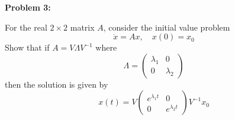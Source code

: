 \documentclass[12pt]{article}
\newenvironment{problem}[1]{
    \textbf{Problem #1:}
}{
    \rmfamily \vspace{1em}
}
\begin{document}
\begin{problem}{3}
    For the real \(2 \times 2\) matrix \(A\), consider the initial value problem
    \[
        \dot{x} = Ax, \quad x(0) = x_0
    \]
    Show that if \(A = V\Lambda V^{-1}\) where
    \[
        \Lambda = \begin{pmatrix}
            \lambda_1 & 0 \\
            0 & \lambda_2
        \end{pmatrix}
    \]
    then the solution is given by
    \[
        x(t) = V\begin{pmatrix}
            e^{\lambda_1 t} & 0 \\
            0 & e^{\lambda_2 t}
        \end{pmatrix}V^{-1}x_0
    \]
\end{problem}
\end{document}
